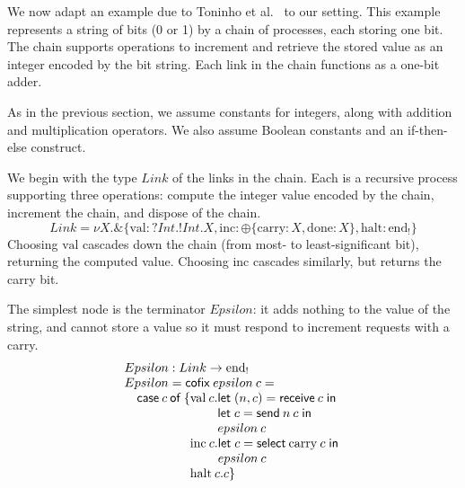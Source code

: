 \documentclass[orivec,envcountsame]{llncs}
\makeatletter
\newcommand{\with}{\mathbin\binampersand}
\newcommand{\parr}{\mathbin\bindnasrepma}
\newcommand{\cpdual}[1]{#1^\perp}
\newcommand{\gvout}[2]{{!#1.#2}}
\newcommand{\gvin}[2]{{?#1.#2}}
\newcommand{\outterm}{\mathrm{end}_!}
\newcommand{\mkwd}[1]{\mathsf{#1}}
\newcommand{\clabel}[1]{\mathrm{#1}}
\newcommand{\gvsend}[2]{\mkwd{send}\:#1\:#2}
\newcommand{\gvreceive}[1]{\mkwd{receive}\:#1}
\newcommand{\gvlet}[3]{\mkwd{let}\;#1 = #2\;\mkwd{in}\;#3}
\newcommand{\gvselect}[2]{\mkwd{select}\:#1\:#2}
\newcommand{\lrkwd}{\mkwd{cofix}}
\newcommand{\ba}{\begin{array}}
\newcommand{\ea}{\end{array}}
\newcommand{\bl}{\ba[t]{@{}l@{}}}
\newcommand{\el}{\ea}
\makeatother
\begin{document}
We now adapt an example due to Toninho et al.~\cite{Toninho13} to our setting. This example
represents a string of bits (0 or 1) by a chain of processes, each storing one bit. The chain
supports operations to increment and retrieve the stored value as an integer encoded by the bit
string. Each link in the chain functions as a one-bit adder.

As in the previous section, we assume constants for integers, along with addition and multiplication
operators. We also assume Boolean constants and an if-then-else construct.

We begin with the type $Link$ of the links in the chain. Each is a recursive process supporting
three operations: compute the integer value encoded by the chain, increment the chain, and dispose
of the chain.
%
\[
 Link = \nu X. \with \{ \clabel{val}: \gvin{Int}{\gvout{Int}{X}},
                        \clabel{inc}: \oplus \{ \clabel{carry}: X,
                        \clabel{done}: X \},
                        \clabel{halt}: \outterm \}
\]
Choosing $\clabel{val}$ cascades down the chain (from most- to least-significant bit), returning the
computed value. Choosing $\clabel{inc}$ cascades similarly, but returns the carry bit.

The simplest node is the terminator $Epsilon$: it adds nothing to the value of the string, and
cannot store a value so it must respond to increment requests with a carry.
\[
\bl
Epsilon : Link \to \outterm \\
Epsilon = \lrkwd\:epsilon\:c = \\
\quad \mkwd{case}\:c\:\mkwd{of}\:\{
  \bl
  \clabel{val}\:c.
    \bl
    \gvlet{(n,c)}{\gvreceive{c}}{} \\
    \gvlet{c}{\gvsend{n}{c}}{} \\
    epsilon\:c \\
    \el \\
  \clabel{inc}\:c.
    \bl
    \gvlet{c}{\gvselect{\clabel{carry}}{c}}{} \\
    epsilon\:c \\
    \el \\
  \clabel{halt}\:c. c\}  \\
  \el \\
\el
\]
\end{document}
